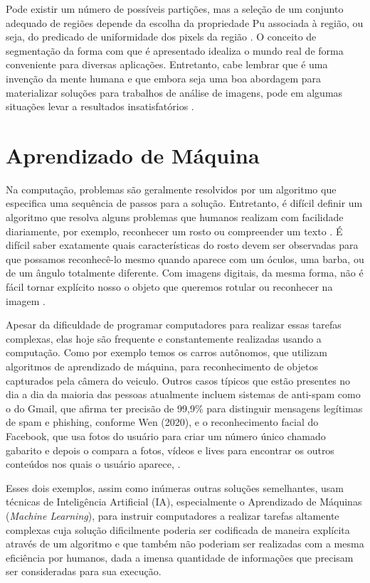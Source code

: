 \documentclass[openright]{UFRGS} %
\begin{document}
Pode existir um número de possíveis partições, mas a seleção de um conjunto adequado
de regiões depende da escolha da propriedade Pu associada à região, ou seja, do
predicado de uniformidade dos pixels da região \cite{pavlidis2013structural}. O conceito de segmentação da forma com que é apresentado idealiza o mundo real de
forma conveniente para diversas aplicações. Entretanto, cabe lembrar que é uma
invenção da mente humana e que embora seja uma boa abordagem para materializar
soluções para trabalhos de análise de imagens, pode em algumas situações levar a
resultados insatisfatórios \cite{davies2004machine}. 



\section{Aprendizado de Máquina}

Na computação, problemas são geralmente resolvidos por um algoritmo que especifica uma sequência de passos para a solução. Entretanto, é difícil definir um algoritmo que resolva alguns problemas que humanos realizam com facilidade diariamente, por exemplo, reconhecer um rosto ou compreender um texto \cite{watkins2001structural}. É difícil saber exatamente quais características do rosto devem ser observadas para que possamos reconhecê-lo mesmo quando aparece com um óculos, uma barba, ou de um ângulo totalmente diferente. Com imagens digitais, da mesma forma, não é fácil tornar explícito nosso o objeto que queremos rotular ou reconhecer na imagem \cite{watkins2001structural}.

Apesar da dificuldade de programar computadores para realizar essas tarefas complexas, elas hoje são frequente e constantemente realizadas usando a computação. Como por exemplo temos os carros autônomos, que utilizam algoritmos de aprendizado de máquina, para reconhecimento de objetos capturados pela câmera do veiculo. Outros casos
típicos que estão presentes no dia a dia da maioria das pessoas atualmente incluem sistemas de anti-spam como o do Gmail, que afirma ter precisão de 99,9\% para distinguir mensagens legítimas de spam e phishing, conforme Wen (2020), e o reconhecimento facial do Facebook, que usa fotos do usuário para criar um número único chamado gabarito e depois o compara a fotos, vídeos e lives para encontrar os outros conteúdos nos quais o usuário aparece, \cite{bachrach2012personality} .

Esses dois exemplos, assim como inúmeras outras soluções semelhantes, usam
técnicas de Inteligência Artificial (IA), especialmente o Aprendizado de Máquinas (\textit{Machine Learning}), para instruir computadores a realizar tarefas altamente complexas cuja solução dificilmente poderia ser codificada de maneira explícita através de um algoritmo e que também não poderiam ser realizadas com a mesma eficiência por
humanos, dada a imensa quantidade de informações que precisam ser consideradas para sua execução.
\end{document}
